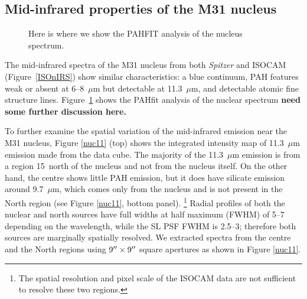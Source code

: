 \subsection{Mid-infrared properties of the M31 nucleus}
\label{sect:nucleus}

\begin{figure}
\centering
\caption{Here is where we show the PAHFIT analysis of the nucleus spectrum.}
\label{fig:nuc_pahfit}
\end{figure}

The mid-infrared spectra of the M31 nucleus from both {\em Spitzer} and ISOCAM (Figure~\ref{ISOnIRS}) show similar characteristics: a blue
continuum, PAH features weak or absent at 6--8~$\mu$m  but detectable at 11.3~$\mu$m, and detectable atomic fine structure lines.
Figure~\ref{fig:nuc_pahfit} shows the PAHfit analysis of the nuclear spectrum 
 {\bf need some further discussion  here.}


To further examine the spatial variation of the mid-infrared emission near the M31 nucleus,
Figure \ref{nuc11} (top) shows the integrated intensity map of 11.3~$\mu$m emission made from the data cube. 
The majority of the 11.3~$\mu$m  emission is from a region 15\arcsec\ north of the nucleus and not from the nucleus itself. 
On the other hand, the centre shows little PAH emission,  but it does have silicate emission around 9.7~$\mu$m, 
which comes only from the nucleus and is not present in the North region  (see Figure \ref{nuc11}, bottom panel).%
\footnote{The spatial resolution and pixel scale of the ISOCAM data are not sufficient to resolve these two regions.}
Radial profiles of both the nuclear and north sources have full widths at half maximum (FWHM) of 5--7\arcsec
depending on the wavelength, while the SL PSF FWHM is 2.5--3\arcsec; therefore both sources are
marginally spatially resolved.  %
We extracted spectra from the centre and the North regions using  $9\hbox{$^{\prime\prime}$} \times 9\hbox{$^{\prime\prime}$}$ 
square apertures as shown in Figure \ref{nuc11}. 


